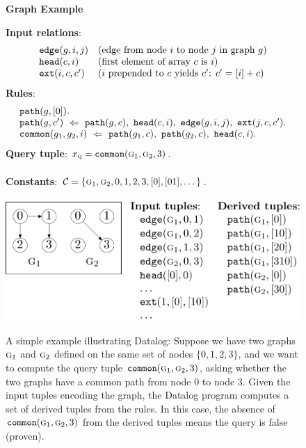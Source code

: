 \begin{figure}
\begin{center} {\bf Graph Example} \end{center}
{\bf Input relations}:
\[
\begin{array}{ll}
\text{\tt edge}(g,i,j) & \text{(edge from node $i$ to node $j$ in graph $g$)} \\
\text{\tt head}(c,i)   & \text{(first element of array $c$ is $i$)} \\
\text{\tt ext}(i,c,c') & \text{($i$ prepended to $c$ yields $c'$: $c' = [i]+c$)} \\
\end{array}
\]
{\bf Rules}:
\[
\begin{array}{l}
\path(g,[\initNode]). \\
\path(g,c')\ \dlogUpdate\ \path(g,c),\ \head(c,i),\ \edge(g, i, j),\ \ext(j, c, c'). \\
\common(g_1,g_2,i)\ \dlogUpdate\ \path(g_1,c),\ \path(g_2,c),\ \head(c,i). \\
\end{array}
\]
{\bf Query tuple}: $x_\text{\sc q} = \text{\tt common}(\text{\sc g}_1,\text{\sc g}_2,3)$. \\
\\
{\bf Constants}: $\mathcal{C} = \{ \text{\sc g}_1, \text{\sc g}_2, 0, 1, 2, 3, [0], [01], \dots \}$.
\\
\\
\includegraphics[scale=0.5]{figures/graphExample}
\caption{\label{fig:graphExample}
A simple example illustrating Datalog:
Suppose we have two graphs $\text{\sc g}_1$ and $\text{\sc g}_2$ defined on the same set of nodes $\{0,1,2,3\}$,
and we want to compute the query tuple $\text{\tt common}(\text{\sc g}_1,\text{\sc g}_2,3)$,
asking whether the two graphs have a common path from node $0$ to node $3$.
Given the input tuples encoding the graph,
the Datalog program computes a set of derived tuples from the rules.
In this case, the absence of $\text{\tt common}(\text{\sc g}_1,\text{\sc g}_2,3)$ from the derived tuples means the query is false (proven).
}
\end{figure}

